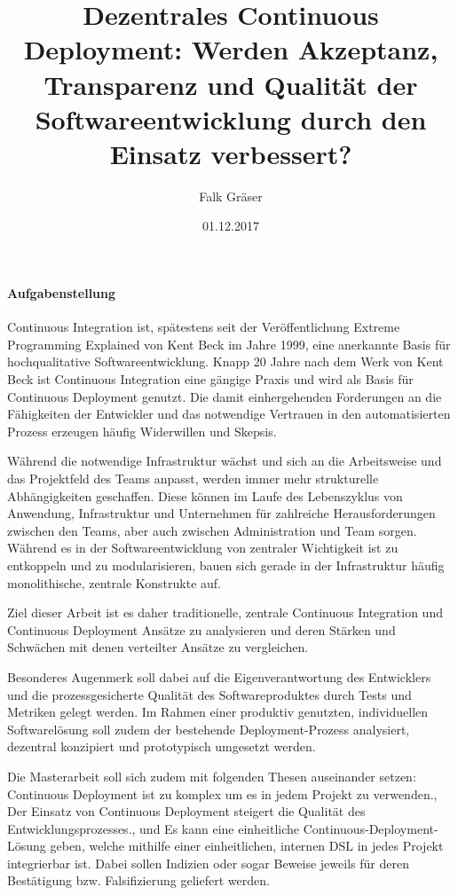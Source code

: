 \documentclass[11pt,english,german]{article}
\begin{document}
\sffamily

\title{\textbf{Dezentrales Continuous Deployment: Werden Akzeptanz, Transparenz und Qualität der Softwareentwicklung durch den Einsatz verbessert?}}
\author{Falk Gräser}
\date{01.12.2017}

\maketitle
{}

\paragraph{\textsf{Aufgabenstellung}}
Continuous Integration ist, spätestens seit der Veröffentlichung \glqq Extreme Programming Explained\grqq{} von Kent Beck im Jahre 1999, eine anerkannte Basis für hochqualitative Softwareentwicklung. Knapp 20 Jahre nach dem Werk von Kent Beck ist Continuous Integration eine gängige Praxis und wird als Basis für Continuous Deployment genutzt. Die damit einhergehenden Forderungen an die Fähigkeiten der Entwickler und das notwendige Vertrauen in den automatisierten Prozess erzeugen häufig Widerwillen und Skepsis.

Während die notwendige Infrastruktur wächst und sich an die Arbeitsweise und das Projektfeld des Teams anpasst, werden immer mehr strukturelle Abhängigkeiten geschaffen. Diese können im Laufe des Lebenszyklus von Anwendung, Infrastruktur und Unternehmen für zahlreiche Herausforderungen zwischen den Teams, aber auch zwischen Administration und Team sorgen.
Während es in der Softwareentwicklung von zentraler Wichtigkeit ist zu entkoppeln und zu modularisieren, bauen sich gerade in der Infrastruktur häufig monolithische, zentrale Konstrukte auf.

Ziel dieser Arbeit ist es daher traditionelle, zentrale Continuous Integration und Continuous Deployment Ansätze zu analysieren und deren Stärken und Schwächen mit denen verteilter Ansätze zu vergleichen.

Besonderes Augenmerk soll dabei auf die Eigenverantwortung des Entwicklers und die prozessgesicherte Qualität des Softwareproduktes durch Tests und Metriken gelegt werden.
Im Rahmen einer produktiv genutzten, individuellen Softwarelösung soll zudem der bestehende Deployment-Prozess analysiert, dezentral konzipiert und prototypisch umgesetzt werden.

Die Masterarbeit soll sich zudem mit folgenden Thesen auseinander setzen:
\glqq Continuous Deployment ist zu komplex um es in jedem Projekt zu verwenden.\grqq{},
\glqq Der Einsatz von Continuous Deployment steigert die Qualität des Entwicklungsprozesses.\grqq{}, und
\glqq Es kann eine einheitliche Continuous-Deployment-Lösung geben, welche mithilfe einer einheitlichen, internen DSL in jedes Projekt integrierbar ist.\grqq{}
Dabei sollen Indizien oder sogar Beweise jeweils für deren Bestätigung bzw. Falsifizierung geliefert werden.
\end{document}
